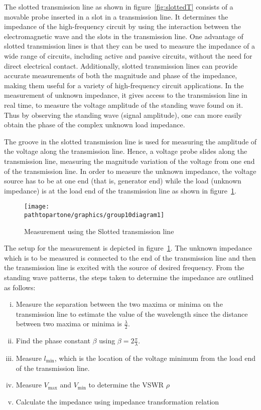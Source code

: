 The slotted transmission line as shown in figure~\ref{fig:slottedT} consists of a movable probe inserted in a slot in a transmission line. It determines the impedance of the high-frequency circuit by using the interaction between the electromagnetic wave and the slots in the transmission line. One advantage of slotted transmission lines is that they can be used to measure the impedance of a wide range of circuits, including active and passive circuits, without the need for direct electrical contact. Additionally, slotted transmission lines can provide accurate measurements of both the magnitude and phase of the impedance, making them useful for a variety of high-frequency circuit applications. In the measurement of unknown impedance, it gives access to the transmission line in real time, to measure the voltage amplitude of the standing wave found on it. Thus by observing the standing wave (signal amplitude), one can more easily obtain the phase of the complex unknown load impedance.

The groove in the slotted transmission line is used for measuring the amplitude of the voltage along the transmission line. Hence, a voltage probe slides along the transmission line, measuring the magnitude variation of the voltage from one end of the transmission line. In order to measure the unknown impedance, the voltage source has to be at one end (that is, generator end) while the load (unknown impedance) is at the load end of the transmission line as shown in figure~\ref{fig:group10diagram1}.
\begin{figure}[h]
\centering
\texttt{[image: \\pathtopartone/graphics/group10diagram1]}
\caption{Measurement using the Slotted transmission line}
\label{fig:group10diagram1}
\end{figure}

The setup for the measurement is depicted in figure~\ref{fig:group10diagram1}. The unknown impedance which is to be measured is connected to the end of the transmission line and then the transmission line is excited with the source of desired frequency. From the standing wave patterns, the steps taken to determine the impedance are outlined as follows:
\begin{enumerate}[(i)]
\item Measure the separation between the two maxima or minima on the transmission line to estimate the value of the wavelength since the distance between two maxima or minima is $\frac{\lambda}{2}$.
\item Find the phase constant $\beta$ using $\beta = 2\frac{\pi}{\lambda}$.
\item Measure $l_\min$, which is the location of the voltage minimum from the load end of the transmission line.
\item Measure $V_\max$ and $V_\min$ to determine the VSWR $\rho$
\item Calculate the impedance using impedance transformation relation
\end{enumerate}

